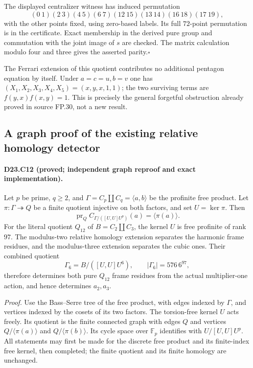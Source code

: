 The displayed centralizer witness has induced permutation
\[
 (0\ 1)(2\ 3)(4\ 5)(6\ 7)(12\ 15)(13\ 14)
             (16\ 18)(17\ 19),
\]
with the other points fixed, using zero-based labels.
Its full $72$-point permutation is in the certificate.  Exact
membership in the derived pure group and commutation with the
joint image of $s$ are checked.  The matrix calculation modulo
four and three gives the asserted parity.\hfill$\square$

The Ferrari extension of this quotient contributes no additional
pentagon equation by itself.  Under $a=c=u,b=v$ one has
$(X_1,X_2,X_3,X_4,X_5)=(x,y,x,1,1)$; the two surviving terms
are $f(y,x)f(x,y)=1$.  This is precisely the general forgetful
obstruction already proved in source FP.30, not a new result.

\subsection{A graph proof of the existing relative homology detector}

\paragraph{D23.C12 (proved; independent graph reproof and exact implementation).}
Let $p$ be prime, $q\ge2$, and
$\Gamma=C_p\amalg C_q=\langle a,b\rangle$ be the profinite
free product.  Let $\pi:\Gamma\twoheadrightarrow Q$ be a finite
quotient injective on both factors, and set $U=\ker\pi$.
Then
\[
 \operatorname{pr}_Q C_{\Gamma/([U,U]U^p)}(a)
       =\langle\pi(a)\rangle.
\]
For the literal quotient $Q_{12}$ of $B=C_2\amalg C_3$, the
kernel $U$ is free profinite of rank $97$.  The modulus-two
relative homology extension separates the harmonic frame residues,
and the modulus-three extension separates the cubic ones.  Their
combined quotient
\[
 \Gamma_6=B/([U,U]U^6),\qquad |\Gamma_6|=576\,6^{97},
\]
therefore determines both pure $Q_{12}$ frame residues from the
actual multiplier-one action, and hence determines $a_2,a_3$.

\emph{Proof.}
Use the Bass--Serre tree of the free product, with edges indexed
by $\Gamma$, and vertices indexed by the cosets of its two
factors.  The torsion-free kernel $U$ acts freely.  Its quotient
is the finite connected graph with edges $Q$ and vertices
$Q/\langle\pi(a)\rangle$ and $Q/\langle\pi(b)\rangle$.
Its cycle space over $\mathbb F_p$ identifies with
$U/[U,U]U^p$.  All statements may first be made for the discrete
free product and its finite-index free kernel, then completed;
the finite quotient and its finite homology are unchanged.

